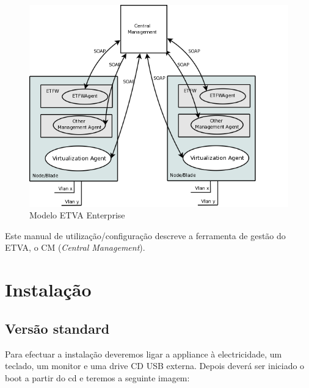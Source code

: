 \begin{description}
\begin{figure}[H]
			\begin{center}
			\includegraphics[scale=0.6]{screenshots/etva_enterprise.png}
			\caption{Modelo ETVA Enterprise}
			\label{fig:etva_enterprise}
			\end{center}
		\end{figure}
\end{description}
 
Este manual de utilização/configuração descreve a ferramenta de gestão do ETVA, o CM (\emph{Central Management}).

\pagebreak
\chapter{\textsf{Instalação}}
\label{chp:installation}
\section{Versão standard}

Para efectuar a instalação deveremos ligar a appliance à electricidade, um teclado, um monitor e uma drive CD USB externa.
Depois deverá ser iniciado o boot a partir do cd e teremos a seguinte imagem:

